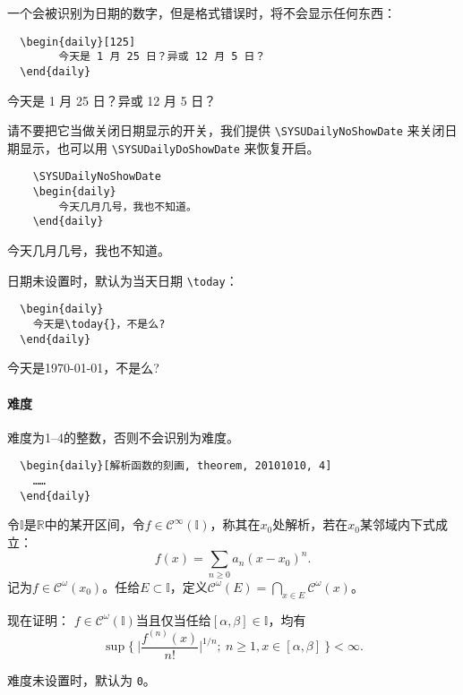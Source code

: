 \documentclass{SYSUDaily}
\begin{document}
一个会被识别为日期的数字，但是格式错误时，将不会显示任何东西：
\begin{multicols}{2}
	\begin{lstlisting}
  \begin{daily}[125]
		今天是 1 月 25 日？异或 12 月 5 日？
  \end{daily}
  \end{lstlisting}
	\small
	\begin{daily}[125]
		今天是 1 月 25 日？异或 12 月 5 日？
	\end{daily}
\end{multicols}
请不要把它当做关闭日期显示的开关，我们提供 \verb|\SYSUDailyNoShowDate| 来关闭日期显示，也可以用 \verb|\SYSUDailyDoShowDate| 来恢复开启。
\begin{multicols}{2}
	\begin{lstlisting}
	\SYSUDailyNoShowDate
	\begin{daily}
		今天几月几号，我也不知道。
	\end{daily}
  \end{lstlisting}
	\small
	\SYSUDailyNoShowDate
	\begin{daily}
		今天几月几号，我也不知道。
	\end{daily}
\end{multicols}
\SYSUDailyDoShowDate
日期未设置时，默认为当天日期 \verb|\today|：
\begin{multicols}{2}
	\begin{lstlisting}
  \begin{daily}
    今天是\today{}，不是么?
  \end{daily}
  \end{lstlisting}
	\small
	\begin{daily}
		今天是\today{}，不是么?
	\end{daily}
\end{multicols}



\paragraph{难度}
难度为1--4的整数，否则不会识别为难度。
\begin{lstlisting}
  \begin{daily}[解析函数的刻画, theorem, 20101010, 4]
    ……
  \end{daily}
\end{lstlisting}
\begin{daily}
	令$\mathbb I$是$\mathbb R$中的某开区间，令$f\in \mathscr{C}^\infty(\mathbb  I)$，称其在$x_0$处解析，若在$x_0$某邻域内下式成立：
	\[
	f(x) = \sum_{n\geqslant0} a_n(x-x_0)^n.
	\]
	记为$f\in \mathscr{C}^\omega(x_0)$。任给$E\subset \mathbb I$，定义$\mathscr{C}^\omega(E)=\bigcap_{x\in E}\mathscr{C}^\omega(x)$。

	现在证明：
	$f\in \mathscr{C}^\omega(\mathbb I)$当且仅当任给$[\alpha,\beta]\in \mathbb I$，均有
	\[
			\sup\biggl\{~\biggl| \frac{f^{(n)}(x)}{n!} \biggr|^{1/n}\!;~n\geqslant 1, x\in [\alpha,\beta] ~\biggr\}   <\infty.
	\]
\end{daily}
难度未设置时，默认为 \verb|0|。
\end{document}
